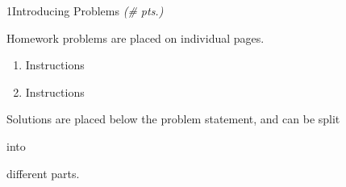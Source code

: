 


%
%

\hwkCompletionDate{\today}



\maketitle

\pagebreak

\begin{hwkProblem}{1}{Introducing Problems \textit{(\# pts.)}} \label{hwk:p01}

    Homework problems are placed on individual pages.

    \begin{enumerate}[label=\alph*.]
        \item \label{hwk:p01a} Instructions
        \item \label{hwk:p01b} Instructions
    \end{enumerate}

    \hwkSol{} \label{hwk:s01}

    Solutions are placed below the problem statement, and can be split

    \hwkPart{} \label{hwk:s01a}

    into

    \hwkPart{} \label{hwk:s01b}

    different parts.

\end{hwkProblem}

